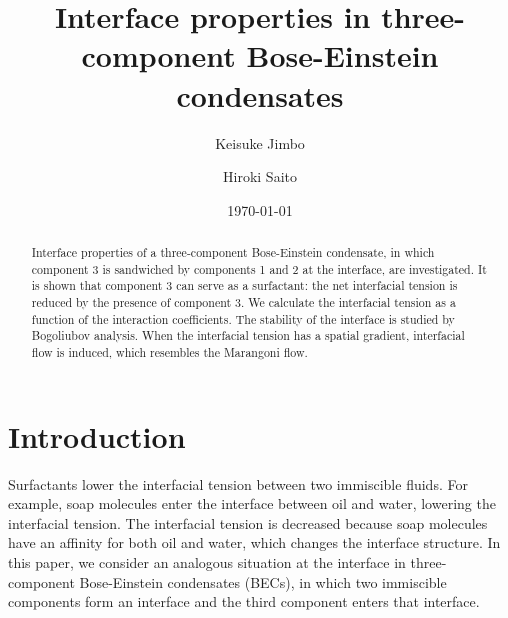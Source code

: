 \documentclass[pra,aps,superscriptaddress,twocolumn,color]{revtex4-1}
\begin{document}
\title{Interface properties in three-component Bose-Einstein condensates}


\author{Keisuke Jimbo}

\author{Hiroki Saito}

\date{\today}

\begin{abstract}
Interface properties of a three-component Bose-Einstein condensate, in which
component 3 is sandwiched by components 1 and 2 at the interface, are
investigated.
It is shown that component 3 can serve as a surfactant: the net interfacial
tension is reduced by the presence of component 3.
We calculate the interfacial tension as a function of the interaction
coefficients.
The stability of the interface is studied by Bogoliubov analysis.
When the interfacial tension has a spatial gradient, interfacial flow is
induced, which resembles the Marangoni flow.
\end{abstract}

\maketitle

\section{Introduction}
\label{s:intro}

Surfactants lower the interfacial tension between two immiscible fluids.
For example, soap molecules enter the interface between oil and water,
lowering the interfacial tension.
The interfacial tension is decreased because soap molecules have an affinity
for both oil and water, which changes the interface structure.
In this paper, we consider an analogous situation at the interface in
three-component Bose-Einstein condensates (BECs), in which two immiscible
components form an interface and the third component enters that interface.
\end{document}
